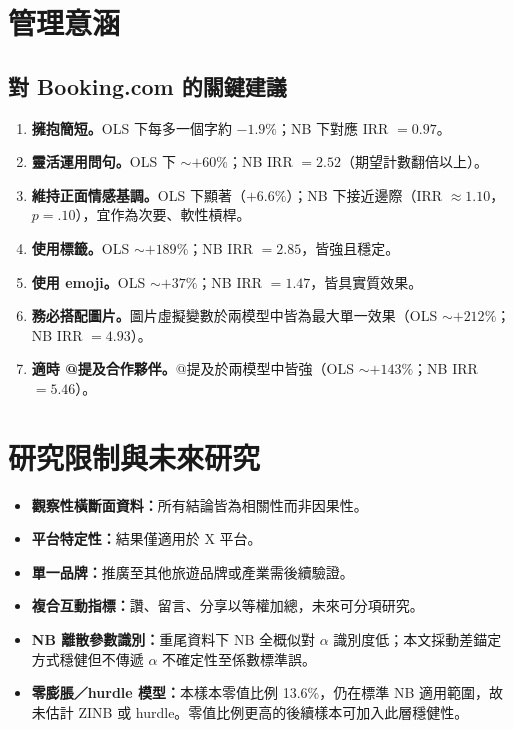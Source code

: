 \documentclass[12pt,a4paper]{ctexart}
\begin{document}
\section{管理意涵}

\subsection{對 Booking.com 的關鍵建議}

\begin{enumerate}
    \item \textbf{擁抱簡短。}OLS 下每多一個字約 $-1.9\%$；NB 下對應 IRR $=0.97$。
    \item \textbf{靈活運用問句。}OLS 下 $\sim+60\%$；NB IRR $=2.52$（期望計數翻倍以上）。
    \item \textbf{維持正面情感基調。}OLS 下顯著（$+6.6\%$）；NB 下接近邊際（IRR $\approx 1.10$，$p=.10$），宜作為次要、軟性槓桿。
    \item \textbf{使用標籤。}OLS $\sim+189\%$；NB IRR $=2.85$，皆強且穩定。
    \item \textbf{使用 emoji。}OLS $\sim+37\%$；NB IRR $=1.47$，皆具實質效果。
    \item \textbf{務必搭配圖片。}圖片虛擬變數於兩模型中皆為最大單一效果（OLS $\sim +212\%$；NB IRR $=4.93$）。
    \item \textbf{適時 @提及合作夥伴。}@提及於兩模型中皆強（OLS $\sim+143\%$；NB IRR $=5.46$）。
\end{enumerate}

\section{研究限制與未來研究}

\begin{itemize}
    \item \textbf{觀察性橫斷面資料：}所有結論皆為相關性而非因果性。
    \item \textbf{平台特定性：}結果僅適用於 X 平台。
    \item \textbf{單一品牌：}推廣至其他旅遊品牌或產業需後續驗證。
    \item \textbf{複合互動指標：}讚、留言、分享以等權加總，未來可分項研究。
    \item \textbf{NB 離散參數識別：}重尾資料下 NB 全概似對 $\alpha$ 識別度低；本文採動差錨定方式穩健但不傳遞 $\alpha$ 不確定性至係數標準誤。
    \item \textbf{零膨脹／hurdle 模型：}本樣本零值比例 13.6\%，仍在標準 NB 適用範圍，故未估計 ZINB 或 hurdle。零值比例更高的後續樣本可加入此層穩健性。
\end{itemize}
\end{document}
